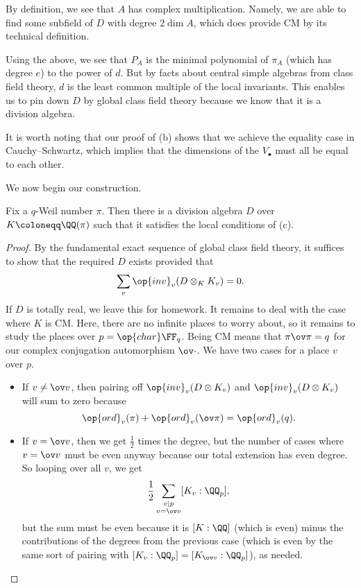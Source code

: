 \documentclass[../notes.tex]{subfiles}
\begin{document}
\begin{remark}
	By definition, we see that $A$ has complex multiplication. Namely, we are able to find some subfield of $D$ with degree $2\dim A$, which does provide CM by its technical definition.
\end{remark}
\begin{remark}
	Using the above, we see that $P_A$ is the minimal polynomial of $\pi_A$ (which has degree $e$) to the power of $d$. But by facts about central simple algebras from class field theory, $d$ is the least common multiple of the local invariants. This enables us to pin down $D$ by global class field theory because we know that it is a division algebra.
\end{remark}
\begin{remark}
	It is worth noting that our proof of (b) shows that we achieve the equality case in Cauchy--Schwartz, which implies that the dimensions of the $V_\bullet$ must all be equal to each other.
\end{remark}
We now begin our construction.
\begin{lemma}
	Fix a $q$-Weil number $\pi$. Then there is a division algebra $D$ over $K\coloneqq\QQ(\pi)$ such that it satisfies the local conditions of (c).
\end{lemma}
\begin{proof}
	By the fundamental exact sequence of global class field theory, it suffices to show that the required $D$ exists provided that
	\[\sum_v\op{inv}_v(D\otimes_KK_v)=0.\]
	If $D$ is totally real, we leave this for homework. It remains to deal with the case where $K$ is CM. Here, there are no infinite places to worry about, so it remains to study the places over $p=\op{char}\FF_q$. Being CM means that $\pi\ov\pi=q$ for our complex conjugation automorphism $\ov\cdot$. We have two cases for a place $v$ over $p$.
	\begin{itemize}
		\item If $v\ne\ov v$, then pairing off $\op{inv}_v(D\otimes K_v)$ and $\op{inv}_v(D\otimes K_v)$ will sum to zero because
		\[\op{ord}_v(\pi)+\op{ord}_v(\ov\pi)=\op{ord}_v(q).\]
		\item If $v=\ov v$, then we get $\frac12$ times the degree, but the number of cases where $v=\ov v$ must be even anyway because our total extension has even degree. So looping over all $v$, we get
		\[\frac12\sum_{\substack{v\mid p\\v=\ov v}}[K_v:\QQ_p],\]
		but the sum must be even because it is $[K:\QQ]$ (which is even) minus the contributions of the degrees from the previous case (which is even by the same sort of pairing with $[K_v:\QQ_p]=[K_{\ov v}:\QQ_p]$), as needed.
		\qedhere
	\end{itemize}
\end{proof}
\end{document}
